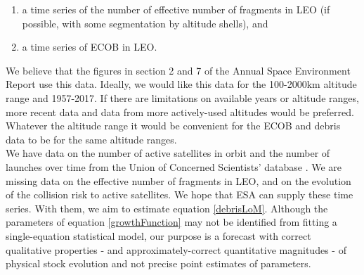 \documentclass[12pt]{article}
\begin{document}
\begin{enumerate}
	\item a time series of the number of effective number of fragments in LEO (if possible, with some segmentation by altitude shells), and
	\item a time series of ECOB in LEO.
\end{enumerate}

We believe that the figures in section 2 and 7 of the Annual Space Environment Report use this data. Ideally, we would like this data for the 100-2000km altitude range and 1957-2017. If there are limitations on available years or altitude ranges, more recent data and data from more actively-used altitudes would be preferred. Whatever the altitude range it would be convenient for the ECOB and debris data to be for the same altitude ranges. \\

We have data on the number of active satellites in orbit and the number of launches over time from the Union of Concerned Scientists' database \cite{UCSdata}. We are missing data on the effective number of fragments in LEO, and on the evolution of the collision risk to active satellites. We hope that ESA can supply these time series. With them, we aim to estimate equation \ref{debrisLoM}. Although the parameters of equation \ref{growthFunction} may not be identified from fitting a single-equation statistical model, our purpose is a forecast with correct qualitative properties - and approximately-correct quantitative magnitudes - of physical stock evolution and not precise point estimates of parameters.



\end{document}

